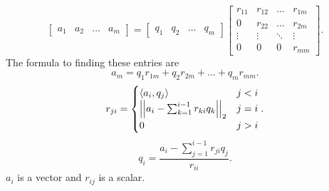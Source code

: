 \documentclass[letterpaper]{article}
\newcommand{\0}{\mathbf{0}}
\begin{document}
\[\begin{bmatrix}
    a_1 & a_2 & \hdots & a_m
\end{bmatrix} = \begin{bmatrix}
    q_1 & q_2 & \hdots & q_m
\end{bmatrix} \begin{bmatrix}
    r_{11} & r_{12} & \hdots & r_{1m} \\ 
    0      & r_{22} & \hdots & r_{2m} \\ 
    \vdots & \vdots & \ddots & \vdots \\ 
    0      & 0      & 0      & r_{mm} 
\end{bmatrix}.\] 
The formula to finding these entries are 
\[a_m = q_1 r_{1m} + q_2 r_{2m} + \hdots + q_m r_{mm}.\]
\[r_{ji} = \begin{cases}
    \langle a_{i}, q_{j} \rangle & j < i \\ 
    \left|\left| a_i - \sum_{k = 1}^{i - 1} r_{ki} q_k \right|\right|_2 & j = i \\ 
    0 & j > i
\end{cases}.\]
\[q_{i} = \frac{a_i - \sum_{j = 1}^{i - 1} r_{ji} q_j}{r_{ii}}.\]
$a_i$ is a vector and $r_{ij}$ is a scalar. 
\end{document}

